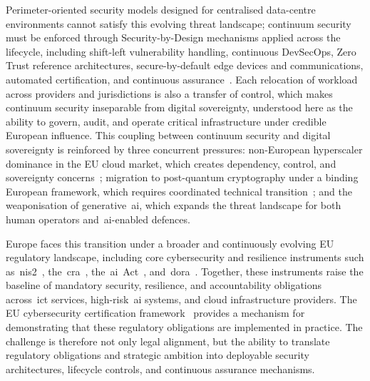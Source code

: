 \documentclass{ieeeaccess}
\begin{document}
Perimeter-oriented security models designed for centralised data-centre environments cannot satisfy this evolving threat landscape; continuum security must be enforced through Security-by-Design mechanisms applied across the lifecycle, including shift-left vulnerability handling, continuous DevSecOps, Zero Trust reference architectures, secure-by-default edge devices and communications, automated certification, and continuous assurance~\cite{chandramouli2022devsecops,rose2020zta,enisa2019iotsdlc,cavoukian2009}. Each relocation of workload across providers and jurisdictions is also a transfer of control, which makes continuum security inseparable from digital sovereignty, understood here as the ability to govern, audit, and operate critical infrastructure under credible European influence. This coupling between continuum security and digital sovereignty is reinforced by three concurrent pressures: non-European hyperscaler dominance in the EU cloud market, which creates dependency, control, and sovereignty concerns~\cite{synergy2025}; migration to post-quantum cryptography under a binding European framework, which requires coordinated technical transition~\cite{niscg2025pqc}; and the weaponisation of generative~\gls{ai}, which expands the threat landscape for both human operators and~\gls{ai}-enabled defences.

Europe faces this transition under a broader and continuously evolving EU regulatory landscape, including core cybersecurity and resilience instruments such as~\gls{nis2}~\cite{eunis2}, the~\gls{cra}~\cite{eucra2024}, the~\gls{ai}~Act~\cite{euaiact}, and~\gls{dora}~\cite{eudora}. Together, these instruments raise the baseline of mandatory security, resilience, and accountability obligations across~\gls{ict} services, high-risk~\gls{ai} systems, and cloud infrastructure providers. The EU cybersecurity certification framework~\cite{eucsa,commreg2024eucc} provides a mechanism for demonstrating that these regulatory obligations are implemented in practice. The challenge is therefore not only legal alignment, but the ability to translate regulatory obligations and strategic ambition into deployable security architectures, lifecycle controls, and continuous assurance mechanisms.
\end{document}
